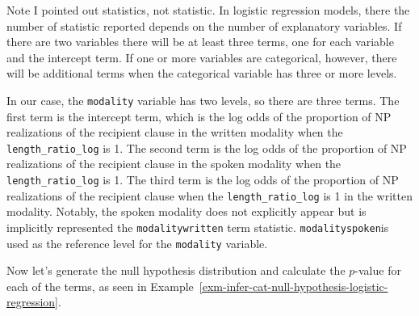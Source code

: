 \documentclass[
  letterpaper,
  krantz1]{latex/krantz-mod}
\theoremstyle{definition}
\theoremstyle{definition}
\theoremstyle{remark}
\begin{document}
Note I pointed out statistics, not statistic. In logistic regression
models, there the number of statistic reported depends on the number of
explanatory variables. If there are two variables there will be at least
three terms, one for each variable and the intercept term. If one or
more variables are categorical, however, there will be additional terms
when the categorical variable has three or more levels.

In our case, the \texttt{modality} variable has two levels, so there are
three terms. The first term is the intercept term, which is the log odds
of the proportion of NP realizations of the recipient clause in the
written modality when the \texttt{length\_ratio\_log} is 1. The second
term is the log odds of the proportion of NP realizations of the
recipient clause in the spoken modality when the
\texttt{length\_ratio\_log} is 1. The third term is the log odds of the
proportion of NP realizations of the recipient clause when the
\texttt{length\_ratio\_log} is 1 in the written modality. Notably, the
spoken modality does not explicitly appear but is implicitly represented
the \texttt{modalitywritten} term statistic. \texttt{modalityspoken}is
used as the reference level for the \texttt{modality} variable.

Now let's generate the null hypothesis distribution and calculate the
\(p\)-value for each of the terms, as seen in
Example~\ref{exm-infer-cat-null-hypothesis-logistic-regression}.

\pagebreak
\end{document}
